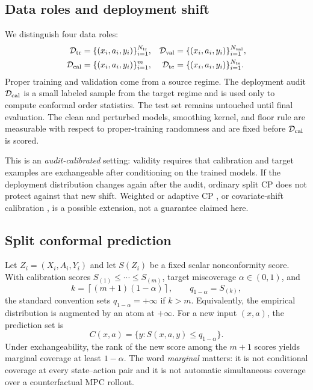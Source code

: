 \documentclass[10pt]{article}
\newcommand{\D}{\mathcal D}
\begin{document}
\subsection{Data roles and deployment shift}

We distinguish four data roles:
\begin{align*}
\D_{\rm tr}&=\{(x_i,a_i,y_i)\}_{i=1}^{N_{\rm tr}},
&\D_{\rm val}&=\{(x_i,a_i,y_i)\}_{i=1}^{N_{\rm val}},\\
\D_{\rm cal}&=\{(x_i,a_i,y_i)\}_{i=1}^{m},
&\D_{\rm te}&=\{(x_i,a_i,y_i)\}_{i=1}^{N_{\rm te}}.
\end{align*}
Proper training and validation come from a source regime. The deployment audit
$\D_{\rm cal}$ is a small labeled sample from the target regime and is used
only to compute conformal order statistics. The test set remains untouched
until final evaluation. The clean and perturbed models, smoothing kernel, and
floor rule are measurable with respect to proper-training randomness and are
fixed before $\D_{\rm cal}$ is scored.

This is an \emph{audit-calibrated} setting: validity requires that calibration
and target examples are exchangeable after conditioning on the trained models.
If the deployment distribution changes again after the audit, ordinary split
CP does not protect against that new shift. Weighted or adaptive CP
\cite{barber2023beyond}, or covariate-shift calibration
\cite{tibshirani2019covariate}, is a possible extension, not a
guarantee claimed here.

\subsection{Split conformal prediction}

Let $Z_i=(X_i,A_i,Y_i)$ and let $S(Z_i)$ be a fixed scalar
nonconformity score. With calibration scores
$S_{(1)}\le\cdots\le S_{(m)}$, target miscoverage $\alpha\in(0,1)$,
and
\begin{equation}
k=\left\lceil (m+1)(1-\alpha)\right\rceil,
\qquad q_{1-\alpha}=S_{(k)},
\label{eq:cp-quantile}
\end{equation}
the standard convention sets $q_{1-\alpha}=+\infty$ if $k>m$. Equivalently,
the empirical distribution is augmented by an atom at $+\infty$. For a new
input $(x,a)$, the prediction set is
\begin{equation}
C(x,a)=\{y:S(x,a,y)\le q_{1-\alpha}\}.
\label{eq:cp-set}
\end{equation}
Under exchangeability, the rank of the new score among the $m+1$ scores yields
marginal coverage at least $1-\alpha$. The word \emph{marginal} matters: it is
not conditional coverage at every state--action pair and it is not automatic
simultaneous coverage over a counterfactual MPC rollout.
\end{document}
